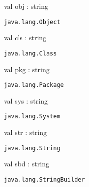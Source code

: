 \documentclass[11pt]{article}
\begin{document}
\begin{ocamldocsigend}


\label{val:Java.Lang.obj}\begin{ocamldoccode}
val obj : string
\end{ocamldoccode}
\begin{ocamldocdescription}
{\tt{java.lang.Object}}


\end{ocamldocdescription}


\label{val:Java.Lang.cls}\begin{ocamldoccode}
val cls : string
\end{ocamldoccode}
\begin{ocamldocdescription}
{\tt{java.lang.Class}}


\end{ocamldocdescription}


\label{val:Java.Lang.pkg}\begin{ocamldoccode}
val pkg : string
\end{ocamldoccode}
\begin{ocamldocdescription}
{\tt{java.lang.Package}}


\end{ocamldocdescription}


\label{val:Java.Lang.sys}\begin{ocamldoccode}
val sys : string
\end{ocamldoccode}
\begin{ocamldocdescription}
{\tt{java.lang.System}}


\end{ocamldocdescription}


\label{val:Java.Lang.str}\begin{ocamldoccode}
val str : string
\end{ocamldoccode}
\begin{ocamldocdescription}
{\tt{java.lang.String}}


\end{ocamldocdescription}


\label{val:Java.Lang.sbd}\begin{ocamldoccode}
val sbd : string
\end{ocamldoccode}
\begin{ocamldocdescription}
{\tt{java.lang.StringBuilder}}


\end{ocamldocdescription}



\end{ocamldocsigend}
\end{document}
